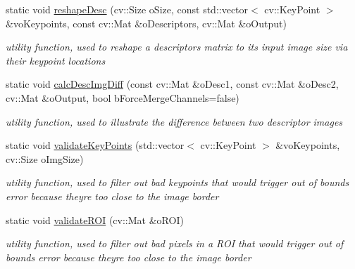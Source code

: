 \begin{DoxyCompactItemize}
static void \mbox{\hyperlink{class_l_b_s_p_a555e2f241fbdac2ebb1eab31482f5f05}{reshape\+Desc}} (cv\+::\+Size o\+Size, const std\+::vector$<$ cv\+::\+Key\+Point $>$ \&vo\+Keypoints, const cv\+::\+Mat \&o\+Descriptors, cv\+::\+Mat \&o\+Output)
\begin{DoxyCompactList}\small\item\em utility function, used to reshape a descriptors matrix to its input image size via their keypoint locations \end{DoxyCompactList}\item 
static void \mbox{\hyperlink{class_l_b_s_p_a5d390a2a6f3d94a4edadae3718daf884}{calc\+Desc\+Img\+Diff}} (const cv\+::\+Mat \&o\+Desc1, const cv\+::\+Mat \&o\+Desc2, cv\+::\+Mat \&o\+Output, bool b\+Force\+Merge\+Channels=false)
\begin{DoxyCompactList}\small\item\em utility function, used to illustrate the difference between two descriptor images \end{DoxyCompactList}\item 
static void \mbox{\hyperlink{class_l_b_s_p_ae5efff966783470187b0a7b7cde63469}{validate\+Key\+Points}} (std\+::vector$<$ cv\+::\+Key\+Point $>$ \&vo\+Keypoints, cv\+::\+Size o\+Img\+Size)
\begin{DoxyCompactList}\small\item\em utility function, used to filter out bad keypoints that would trigger out of bounds error because they\textquotesingle{}re too close to the image border \end{DoxyCompactList}\item 
static void \mbox{\hyperlink{class_l_b_s_p_ad97557be4bc6cfd7b0fa4b01ab8f8c55}{validate\+R\+OI}} (cv\+::\+Mat \&o\+R\+OI)
\begin{DoxyCompactList}\small\item\em utility function, used to filter out bad pixels in a R\+OI that would trigger out of bounds error because they\textquotesingle{}re too close to the image border \end{DoxyCompactList}\end{DoxyCompactItemize}

